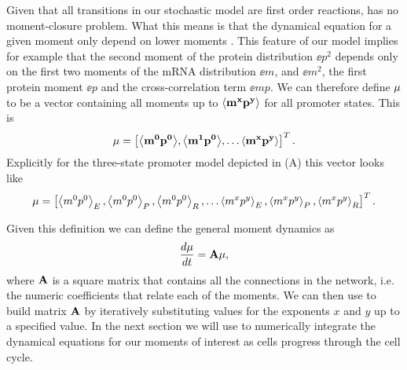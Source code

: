 Given that all transitions in our stochastic model are first order reactions,
 has no moment-closure problem. What this means is that the
dynamical equation for a given moment only depend on lower moments . This feature of our model implies for example that
the second moment of the protein distribution $\ee{p^2}$ depends only on the
first two moments of the mRNA distribution $\ee{m}$, and $\ee{m^2}$, the first
protein moment $\ee{p}$  and the cross-correlation term $\ee{mp}$. We can
therefore define $\mathbf{\mu}$ to be a vector containing all moments up to
$\mathbf{\left\langle m^x p^y \right\rangle}$ for all promoter states. This is
\begin{equation}
\mathbf{\mu} = \left[ \mathbf{\left\langle m^0 p^0 \right\rangle},
								  \mathbf{\left\langle m^1 p^0 \right\rangle},
									\ldots \mathbf{\left\langle m^x p^y \right\rangle} \right]^T.
\end{equation}
Explicitly for the three-state promoter model depicted in
(A) this vector looks like
\begin{equation}
	\mathbf{\mu} = \left[ \left\langle m^0 p^0 \right\rangle_E, \left\langle m^0 p^0 \right\rangle_P, \left\langle m^0 p^0 \right\rangle_R, \ldots
                 \left\langle m^x p^y \right\rangle_E, \left\langle m^x p^y \right\rangle_P, \left\langle m^x p^y \right\rangle_R \right]^T.
\end{equation}

Given this definition we can define the general moment dynamics as
\begin{equation}
{d{\mu} \over dt} = \mathbf{A \mu},
\label{eq_mom_dynamics}
\end{equation}
where $\mathbf{A}$ is a square matrix that contains all the connections in the
network, i.e. the numeric coefficients that relate each of the moments. We can
then use  to build matrix $\mathbf{A}$ by iteratively substituting
values for the exponents $x$ and $y$ up to a specified value. In the next
section we will use  to numerically integrate the
dynamical equations for our moments of interest as cells progress through the
cell cycle.
